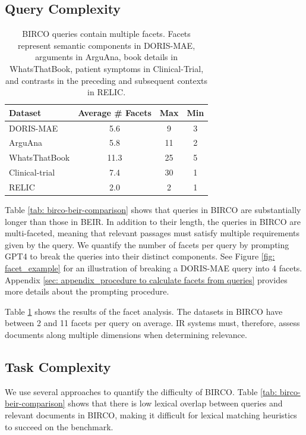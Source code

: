 \documentclass[11pt]{article}
\begin{document}
\subsection{Query Complexity}


\begin{table}[ht]
\centering
\setlength{\tabcolsep}{1.5pt}
\begin{tabular}{l ccc}
\toprule
\textbf{Dataset} & \textbf{Average \# Facets} & \textbf{Max} & \textbf{Min} \\ 
\midrule
DORIS-MAE & 5.6 & 9 & 3 \\ 
ArguAna & 5.8 & 11 & 2 \\ 
WhatsThatBook & 11.3 & 25 & 5 \\ 
Clinical-trial & 7.4 & 30 & 1 \\ 
RELIC & 2.0 & 2 & 1 \\ 
\bottomrule
\end{tabular}
\caption{BIRCO queries contain multiple facets. Facets represent semantic components in DORIS-MAE, arguments in ArguAna, book details in WhatsThatBook, patient symptoms in Clinical-Trial, and contrasts in the preceding and subsequent contexts in RELIC.}
\label{tab: birco-multifacetedness}
\end{table}

Table \ref{tab: birco-beir-comparison} shows that queries in BIRCO are substantially longer than those in BEIR. In addition to their length, the queries in BIRCO are multi-faceted, meaning that relevant passages must satisfy multiple requirements given by the query. We quantify the number of facets per query by prompting GPT4 to break the queries into their distinct components. See Figure \ref{fig: facet_example} for an illustration of breaking a DORIS-MAE query into 4 facets. %
Appendix \ref{sec: appendix_procedure to calculate facets from queries} provides more details about the prompting procedure. 

Table \ref{tab: birco-multifacetedness} shows the results of the facet analysis. The datasets in BIRCO have between 2 and 11 facets per query on average. IR systems must, therefore, assess documents along multiple dimensions when determining relevance.

\subsection{Task Complexity}


We use several approaches to quantify the difficulty of BIRCO. Table \ref{tab: birco-beir-comparison} shows that there is low lexical overlap between queries and relevant documents in BIRCO, making it difficult for lexical matching heuristics to succeed on the benchmark.
\end{document}
